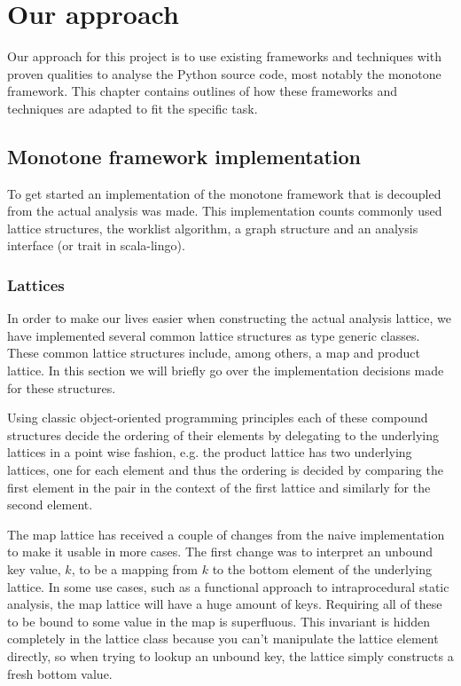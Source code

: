 \chapter{Our approach}

Our approach for this project is to use existing frameworks and techniques with proven qualities to analyse the Python source code, most notably the monotone framework. This chapter contains outlines of how these frameworks and techniques are adapted to fit the specific task.

\section{Monotone framework implementation}

To get started an implementation of the monotone framework that is decoupled from the actual analysis was made. This implementation counts commonly used lattice structures, the worklist algorithm, a graph structure and an analysis interface (or trait in scala-lingo).

\subsection{Lattices}

In order to make our lives easier when constructing the actual analysis lattice, we have implemented several common lattice structures as type generic classes. These common lattice structures include, among others, a map and product lattice. In this section we will briefly go over the implementation decisions made for these structures.

Using classic object-oriented programming principles each of these compound structures decide the ordering of their elements by delegating to the underlying lattices in a point wise fashion, e.g. the product lattice has two underlying lattices, one for each element and thus the ordering is decided by comparing the first element in the pair in the context of the first lattice and similarly for the second element.

The map lattice has received a couple of changes from the naive implementation to make it usable in more cases. The first change was to interpret an unbound key value, $k$, to be a mapping from $k$ to the bottom element of the underlying lattice. In some use cases, such as a functional approach to intraprocedural static analysis, the map lattice will have a huge amount of keys. Requiring all of these to be bound to some value in the map is superfluous. This invariant is hidden completely in the lattice class because you can't manipulate the lattice element directly, so when trying to lookup an unbound key, the lattice simply constructs a fresh bottom value.

